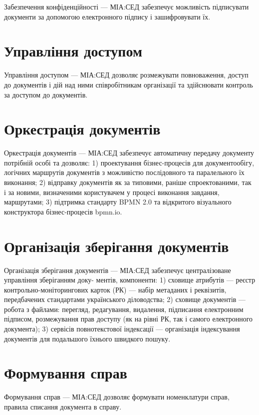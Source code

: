 Забезпечення конфіденційності --- МІА:СЕД забезпечує можливість
підписувати документи за допомогою електронного підпису і зашифровувати їх.

\section{Управління доступом}

Управління доступом --- МІА:СЕД дозволяє розмежувати повноваження, доступ
до документів і дій над ними співробітникам організації та здійснювати контроль
за доступом до документів.

\section{Оркестрація документів}

Оркестрація документів --- МІА:СЕД забезпечує автоматичну передачу
документу потрібній особі та дозволяє:
1) проектування бізнес-процесів для документообігу, логічних маршрутів
документів з можливістю послідовного та паралельного їх виконання;
2) відправку документів як за типовими, раніше спроектованими, так і за
новими, визначеними користувачем у процесі виконання завдання,
маршрутами;
3) підтримка стандарту BPMN 2.0 та відкритого візуального конструктора
бізнес-процесів bpmn.io.

\section{Організація зберігання документів}

Організація зберігання документів --- МІА:СЕД забезпечує централізоване
управління зберіганням доку- ментів, компоненти:
1) сховище атрибутів --- реєстр контрольно-моніторингових карток (РК) —
набір метаданих і реквізитів, передбачених стандартами українського
діловодства;
2) сховище документів --- робота з файлами: перегляд, редагування, видалення,
підписання електронним підписом, розмежування прав доступу (як на рівні
РК, так і самого електронного документа);
3) сервісів повнотекстової індексації --- організація індексування документів
для подальшого їхнього швидкого пошуку.

\section{Формування справ}

Формування справ --- МІА:СЕД дозволяє формувати номенклатури справ,
правила списання документа в справу.

